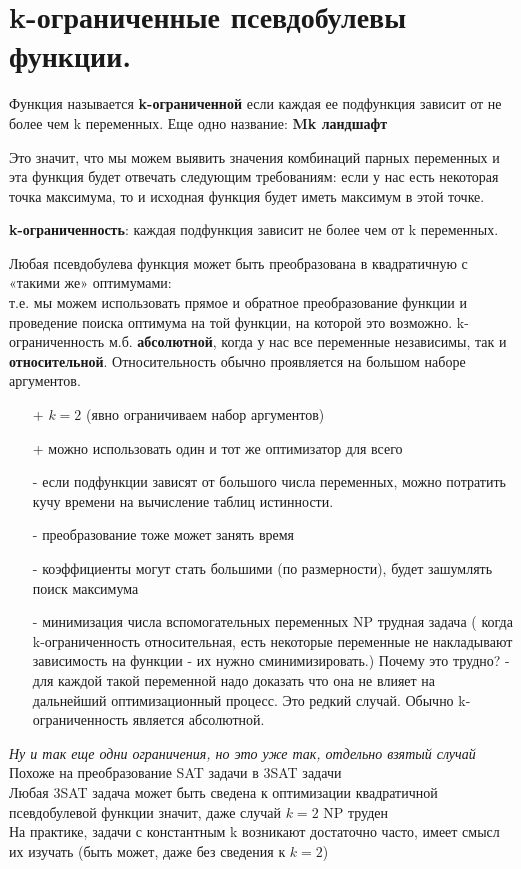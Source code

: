\section{k-ограниченные псевдобулевы функции.}
Функция называется \textbf{k-ограниченной} если каждая ее подфункция зависит от не более чем k переменных. Еще одно название:\textbf{ Mk ландшафт}\\

Это значит, что мы можем выявить значения комбинаций парных переменных и эта функция будет отвечать следующим требованиям: если у нас есть некоторая точка максимума, то и исходная функция будет иметь максимум в этой точке.

\textbf{k-ограниченность}: каждая подфункция зависит не более чем от k переменных.

Любая псевдобулева функция может быть преобразована в квадратичную с
«такими же» оптимумами:\\
т.е. мы можем использовать прямое и обратное преобразование функции и проведение поиска оптимума на той функции, на которой это возможно.
k-ограниченность м.б. \textbf{абсолютной}, когда у нас все переменные независимы, так и \textbf{относительной}. Относительность обычно проявляется на большом наборе аргументов.
\begin{itemize}
    \item[+] $k=2$ (явно ограничиваем набор аргументов)
    \item[+] можно использовать один и тот же оптимизатор для всего
    \item[-] если подфункции зависят от большого числа переменных, можно потратить кучу времени на вычисление таблиц истинности. 
    \item[-] преобразование тоже может занять время
    \item[-] коэффициенты могут стать большими (по размерности), будет зашумлять поиск максимума
    \item[-] минимизация числа вспомогательных переменных NP трудная задача ( когда k-ограниченность относительная, есть некоторые переменные не накладывают зависимость на функции - их нужно сминимизировать.) Почему это трудно? - для каждой такой переменной надо доказать что она не влияет на дальнейший оптимизационный процесс. Это редкий случай. Обычно k-ограниченность является абсолютной.
\end{itemize}
\textit{Ну и так еще одни ограничения, но это уже так, отдельно взятый случай}\\
Похоже на преобразование SAT задачи в 3SAT задачи\\
Любая 3SAT задача может быть сведена к оптимизации квадратичной псевдобулевой функции значит, даже случай $k=2$ NP труден \\
На практике, задачи с константным k возникают достаточно часто, имеет смысл
их изучать (быть может, даже без сведения к $k=2$)
